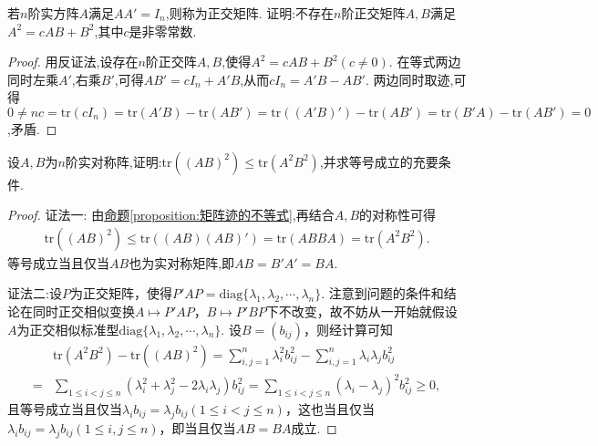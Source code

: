 \documentclass[../../main.tex]{subfiles}
\begin{document}
\begin{example}
若\(n\)阶实方阵\(A\)满足\(AA' = I_n\),则称为正交矩阵. 证明:不存在\(n\)阶正交矩阵\(A,B\)满足\(A^2 = cAB + B^2\),其中\(c\)是非零常数.
\end{example}
\begin{proof}
用反证法,设存在\(n\)阶正交阵\(A,B\),使得\(A^2 = cAB + B^2(c\neq0)\). 在等式两边同时左乘\(A'\),右乘\(B'\),可得\(AB' = cI_n + A'B\),从而\(cI_n = A'B - AB'\). 两边同时取迹,可得\(0\ne nc=\text{tr}(cI_n)=\text{tr}(A'B)-\text{tr}(AB')=\text{tr}((A'B)') - \text{tr}(AB')=\text{tr}(B'A)-\text{tr}(AB') = 0\),矛盾.

\end{proof}

\begin{example}
设\(A,B\)为\(n\)阶实对称阵,证明:\(\text{tr}((AB)^2)\leqslant \text{tr}(A^2B^2)\),并求等号成立的充要条件.
\end{example}
\begin{proof}
{\color{blue}证法一:}
由\hyperref[proposition:矩阵迹的不等式]{命题\ref{proposition:矩阵迹的不等式}},再结合$A,B$的对称性可得
\begin{align*}
\mathrm{tr}\left( \left( AB \right) ^2 \right) \leqslant \mathrm{tr}\left( \left( AB \right) \left( AB \right) ' \right) =\mathrm{tr}\left( ABBA \right) =\mathrm{tr}\left( A^2B^2 \right) .
\end{align*}
等号成立当且仅当$AB$也为实对称矩阵,即\(AB = B'A'=BA\).

{\color{blue}证法二:}设\(P\)为正交矩阵，使得\(P'AP = \mathrm{diag}\{\lambda_1,\lambda_2,\cdots,\lambda_n\}\). 注意到问题的条件和结论在同时正交相似变换\(A\mapsto P'AP\)，\(B\mapsto P'BP\)下不改变，故不妨从一开始就假设\(A\)为正交相似标准型\(\mathrm{diag}\{\lambda_1,\lambda_2,\cdots,\lambda_n\}\). 设\(B=(b_{ij})\)，则经计算可知
\begin{align*}
&\mathrm{tr}(A^2B^2)-\mathrm{tr}((AB)^2)=\sum_{i,j = 1}^{n}\lambda_i^2b_{ij}^2-\sum_{i,j = 1}^{n}\lambda_i\lambda_jb_{ij}^2\\
=&\sum_{1\leqslant  i<j\leqslant  n}(\lambda_i^2+\lambda_j^2 - 2\lambda_i\lambda_j)b_{ij}^2=\sum_{1\leqslant  i<j\leqslant  n}(\lambda_i - \lambda_j)^2b_{ij}^2\geqslant 0,
\end{align*}
且等号成立当且仅当\(\lambda_ib_{ij}=\lambda_jb_{ij}(1\leqslant  i<j\leqslant  n)\)，这也当且仅当\(\lambda_ib_{ij}=\lambda_jb_{ij}(1\leqslant  i,j\leqslant  n)\)，即当且仅当\(AB = BA\)成立. 

\end{proof}
\end{document}
